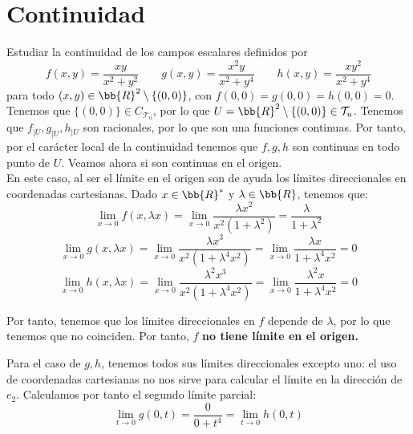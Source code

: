 \section{Continuidad}

\begin{ejercicio}
    Estudiar la continuidad de los campos escalares definidos por
    \begin{equation*}
        f(x,y) = \frac{xy}{x^2+y^2}
        \qquad
        g(x,y)=\frac{x^2y}{x^2+y^4}
        \qquad
        h(x,y)=\frac{xy^2}{x^2+y^4}
    \end{equation*}
    para todo $(x, y) \in \bb{R}^2\setminus \{(0, 0)\}$, con $f(0, 0) = g(0, 0) = h(0, 0) = 0$.\\

    Tenemos que $\{(0,0)\}\in C_{\mathcal{T}_u}$, por lo que $U=\bb{R}^2\setminus \{(0,0)\}\in \mathcal{T}_u$. Tenemos que $f_{\big| U}, g_{\big| U}, h_{\big| U}$ son racionales, por lo que son una funciones continuas. Por tanto, por el carácter local de la continuidad tenemos que $f,g,h$ son continuas en todo punto de $U$. Veamos ahora si son continuas en el origen.\\

    En este caso, al ser el límite en el origen son de ayuda los límites direccionales en coordenadas cartesianas. Dado $x\in \bb{R}^\ast$ y $\lambda\in \bb{R}$, tenemos que:
    \begin{equation*}
        \lim_{x\to 0} f(x,\lambda x) = \lim_{x\to 0}\frac{\lambda x^2}{x^2(1+\lambda^2)} = \frac{\lambda}{1+\lambda^2}
    \end{equation*}
    \begin{equation*}
        \lim_{x\to 0} g(x,\lambda x) = \lim_{x\to 0}\frac{\lambda x^3}{x^2(1+\lambda^4x^2)} = \lim_{x\to 0}\frac{\lambda x}{1+\lambda^4x^2}=0
    \end{equation*}
    \begin{equation*}
        \lim_{x\to 0} h(x,\lambda x) = \lim_{x\to 0}\frac{\lambda^2 x^3}{x^2(1+\lambda^4x^2)} = \lim_{x\to 0}\frac{\lambda^2 x}{1+\lambda^4x^2}=0
    \end{equation*}

    Por tanto, tenemos que los límites direccionales en $f$ depende de $\lambda$, por lo que tenemos que no coinciden. Por tanto, $f$ \textbf{no tiene límite en el origen.}

    Para el caso de $g,h$, tenemos todos sus límites direccionales excepto uno: el uso de coordenadas cartesianas no nos sirve para calcular el límite en la dirección de $e_2$. Calculamos por tanto el segundo límite parcial:
    \begin{equation*}
        \lim_{t\to 0}g(0,t) = \frac{0}{0+t^4} =\lim_{t\to 0}h(0,t)
    \end{equation*}


\end{ejercicio}
